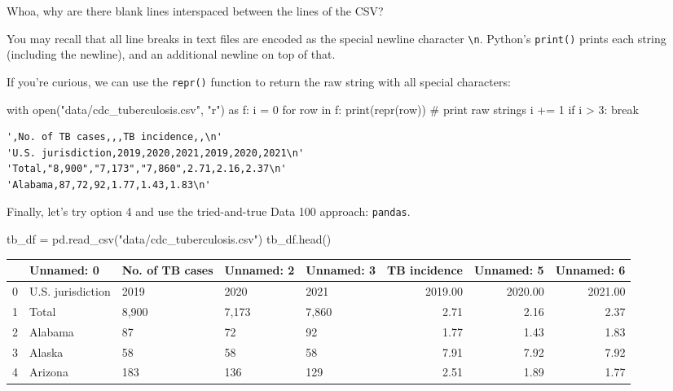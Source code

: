 \documentclass[
  letterpaper,
  DIV=11,
  numbers=noendperiod]{scrreprt}
\newenvironment{Shaded}{\begin{snugshade}}{\end{snugshade}}
\newcommand{\BuiltInTok}[1]{\textcolor[rgb]{0.00,0.23,0.31}{#1}}
\newcommand{\CommentTok}[1]{\textcolor[rgb]{0.37,0.37,0.37}{#1}}
\newcommand{\ControlFlowTok}[1]{\textcolor[rgb]{0.00,0.23,0.31}{#1}}
\newcommand{\DecValTok}[1]{\textcolor[rgb]{0.68,0.00,0.00}{#1}}
\newcommand{\ImportTok}[1]{\textcolor[rgb]{0.00,0.46,0.62}{#1}}
\newcommand{\KeywordTok}[1]{\textcolor[rgb]{0.00,0.23,0.31}{#1}}
\newcommand{\NormalTok}[1]{\textcolor[rgb]{0.00,0.23,0.31}{#1}}
\newcommand{\OperatorTok}[1]{\textcolor[rgb]{0.37,0.37,0.37}{#1}}
\newcommand{\StringTok}[1]{\textcolor[rgb]{0.13,0.47,0.30}{#1}}
\begin{document}
Whoa, why are there blank lines interspaced between the lines of the
CSV?

You may recall that all line breaks in text files are encoded as the
special newline character \texttt{\textbackslash{}n}. Python's
\texttt{print()} prints each string (including the newline), and an
additional newline on top of that.

If you're curious, we can use the \texttt{repr()} function to return the
raw string with all special characters:

\begin{Shaded}
\begin{Highlighting}[]
\ControlFlowTok{with} \BuiltInTok{open}\NormalTok{(}\StringTok{"data/cdc\_tuberculosis.csv"}\NormalTok{, }\StringTok{"r"}\NormalTok{) }\ImportTok{as}\NormalTok{ f:}
\NormalTok{    i }\OperatorTok{=} \DecValTok{0}
    \ControlFlowTok{for}\NormalTok{ row }\KeywordTok{in}\NormalTok{ f:}
        \BuiltInTok{print}\NormalTok{(}\BuiltInTok{repr}\NormalTok{(row)) }\CommentTok{\# print raw strings}
\NormalTok{        i }\OperatorTok{+=} \DecValTok{1}
        \ControlFlowTok{if}\NormalTok{ i }\OperatorTok{\textgreater{}} \DecValTok{3}\NormalTok{:}
            \ControlFlowTok{break}
\end{Highlighting}
\end{Shaded}

\begin{verbatim}
',No. of TB cases,,,TB incidence,,\n'
'U.S. jurisdiction,2019,2020,2021,2019,2020,2021\n'
'Total,"8,900","7,173","7,860",2.71,2.16,2.37\n'
'Alabama,87,72,92,1.77,1.43,1.83\n'
\end{verbatim}

Finally, let's try option 4 and use the tried-and-true Data 100
approach: \texttt{pandas}.

\begin{Shaded}
\begin{Highlighting}[]
\NormalTok{tb\_df }\OperatorTok{=}\NormalTok{ pd.read\_csv(}\StringTok{"data/cdc\_tuberculosis.csv"}\NormalTok{)}
\NormalTok{tb\_df.head()}
\end{Highlighting}
\end{Shaded}

\begin{tabular}{lllllrrr}
\toprule
{} &         Unnamed: 0 & No. of TB cases & Unnamed: 2 & Unnamed: 3 &  TB incidence &  Unnamed: 5 &  Unnamed: 6 \\
\midrule
0 &  U.S. jurisdiction &            2019 &       2020 &       2021 &       2019.00 &     2020.00 &     2021.00 \\
1 &              Total &           8,900 &      7,173 &      7,860 &          2.71 &        2.16 &        2.37 \\
2 &            Alabama &              87 &         72 &         92 &          1.77 &        1.43 &        1.83 \\
3 &             Alaska &              58 &         58 &         58 &          7.91 &        7.92 &        7.92 \\
4 &            Arizona &             183 &        136 &        129 &          2.51 &        1.89 &        1.77 \\
\bottomrule
\end{tabular}
\end{document}
